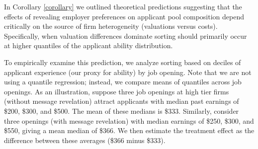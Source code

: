 \documentclass[12pt]{article}
\begin{document}
In Corollary \ref{corollary} we outlined theoretical predictions suggesting that the effects of revealing employer preferences on applicant pool composition depend critically on the source of firm heterogeneity (valuations versus costs). Specifically, when valuation differences dominate sorting should primarily occur at higher quantiles of the applicant ability distribution.

To empirically examine this prediction, we analyze sorting based on deciles of applicant experience (our proxy for ability) by job opening. Note that we are not using a quantile regression; instead, we compare means of quantiles across job openings. As an illustration, suppose three job openings at high tier firms (without message revelation) attract applicants with median past earnings of \$200, \$300, and \$500. The mean of these medians is \$333. Similarly, consider three openings (with message revelation) with median earnings of \$250, \$300, and \$550, giving a mean median of \$366. We then estimate the treatment effect as the difference between these averages (\$366 minus \$333).
\end{document}
